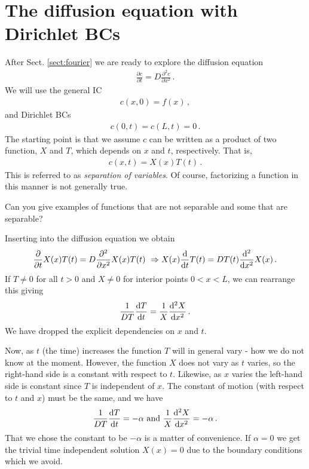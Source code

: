 \section{The diffusion equation with Dirichlet BCs}
After Sect. \ref{sect:fourier} we are ready to explore the diffusion equation
\begin{eqnarray}
	\frac{\partial c}{\partial t} = D\frac{\partial^2c}{\partial x^2} \, .
\end{eqnarray}
We will use the general IC 
\begin{eqnarray}
	c(x, 0) = f(x) \, ,
\end{eqnarray}
and Dirichlet BCs 
\begin{eqnarray}
	\label{eq:bcstart}
	c(0, t) = c(L,t) = 0 \, .
\end{eqnarray}
The starting point is that we assume $c$ can be written as a product of two function, $X$ and $T$, which 
depends on $x$ and $t$, respectively. That is,
\begin{eqnarray}
	c(x,t) = X(x)T(t) \, .
\end{eqnarray}
This is referred to as \emph{separation of variables}. Of course, factorizing a function in this manner
is not generally true.
\begin{question}
Can you give examples of functions that are not separable and some that are separable?
\end{question}

\noindent Inserting into the diffusion equation we obtain
\begin{eqnarray}
	\frac{\partial}{\partial t} X(x)T(t) = D \frac{\partial^2}{\partial x^2} X(x) T(t) \ \Rightarrow 
	X(x) \frac{\mathrm{d}}{\mathrm{d} t} T(t) = D T(t) \frac{\mathrm{d}^2}{\mathrm{d} x^2} X(x)  \, .
\end{eqnarray}
If $T \neq 0$ for all $t>0$ and $X \neq 0$ for interior points $0 < x < L$, we can rearrange this giving
\begin{eqnarray}
	\frac{1}{D T} \frac{\mathrm{d} T}{\mathrm{d} t} = \frac{1}{X}\frac{\mathrm{d}^2X}{\mathrm{d} x^2} \, .
\end{eqnarray}
We have dropped the explicit dependencies on $x$ and $t$. 

Now, as $t$ (the time) increases the function $T$ will in general vary - how we do not know at the moment. 
However, the function $X$ does not vary as $t$ varies, so the right-hand side is a constant 
with respect to $t$. Likewise, as $x$ varies the left-hand side is constant since $T$ is independent of $x$. 
The constant of motion (with respect to $t$ and $x$) must be the same, and we have
\begin{eqnarray}
	\frac{1}{D T} \frac{\d T}{\d t} = -\alpha  \ \text{and} \ \frac{1}{X}\frac{\d^2X}{\d x^2} = -\alpha\, .
\end{eqnarray}
That we chose the constant to be $-\alpha$ is a matter of convenience. If
$\alpha = 0$ we get the trivial time independent solution $X(x) = 0$ due to the
boundary conditions which we avoid. 

